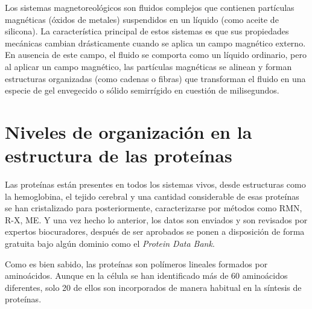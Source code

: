 Los sistemas magnetoreol\'{o}gicos son fluidos complejos que contienen part\'{i}culas magn\'{e}ticas (\'{o}xidos de metales) suspendidos en un l\'{i}quido (como aceite de silicona). La caracter\'{i}stica principal de estos sistemas es que sus propiedades mec\'{a}nicas cambian dr\'{a}sticamente cuando se aplica un campo magn\'{e}tico externo. En ausencia de este campo, el ﬂuido se comporta como un l\'{i}quido ordinario, pero al aplicar un campo magn\'{e}tico, las part\'{i}culas magn\'{e}ticas se alinean y forman estructuras organizadas (como cadenas o ﬁbras) que transforman el ﬂuido en una especie de gel envegecido o s\'{o}lido semirr\'{i}gido en cuesti\'{o}n de milisegundos. 

 
 
 
\section{Niveles de organizaci\'{o}n en la estructura de las prote\'{i}nas}


Las prote\'{i}nas est\'{a}n presentes en todos los sistemas vivos, desde estructuras como la hemoglobina, el tejido cerebral y una cantidad considerable de esas prote\'{i}nas se han cristalizado para
posteriormente, caracterizarse por m\'{e}todos como RMN, R-X, ME. Y una vez hecho lo anterior, los datos son enviados y son revisados por expertos biocuradores, despu\'{e}s de
ser aprobados se ponen a disposici\'{o}n de forma gratuita bajo alg\'{u}n dominio como el \textit{Protein Data Bank}.

Como es bien sabido, las prote\'{i}nas son pol\'{i}meros lineales formados por amino\'{a}cidos. Aunque en la c\'{e}lula se han identificado m\'{a}s de 60 amino\'{a}cidos diferentes, solo 20 de ellos son incorporados de manera habitual en la s\'{i}ntesis de prote\'{i}nas.

